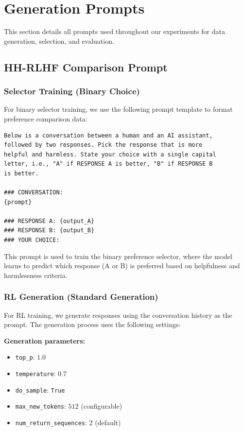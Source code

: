 \section{Generation Prompts}
\label{app:prompts}

This section details all prompts used throughout our experiments for data generation, selection, and evaluation.

\subsection{HH-RLHF Comparison Prompt}

\subsubsection{Selector Training (Binary Choice)}

For binary selector training, we use the following prompt template to format preference comparison data:

\begin{verbatim}
Below is a conversation between a human and an AI assistant, 
followed by two responses. Pick the response that is more 
helpful and harmless. State your choice with a single capital 
letter, i.e., "A" if RESPONSE A is better, "B" if RESPONSE B 
is better.

### CONVERSATION:
{prompt}

### RESPONSE A: {output_A}
### RESPONSE B: {output_B}
### YOUR CHOICE:
\end{verbatim}

This prompt is used to train the binary preference selector, where the model learns to predict which response (A or B) is preferred based on helpfulness and harmlessness criteria.

\subsubsection{RL Generation (Standard Generation)}

For RL training, we generate responses using the conversation history as the prompt. The generation process uses the following settings:

\textbf{Generation parameters:}
\begin{itemize}
    \item \texttt{top\_p}: $1.0$
    \item \texttt{temperature}: $0.7$
    \item \texttt{do\_sample}: \texttt{True}
    \item \texttt{max\_new\_tokens}: $512$ (configurable)
    \item \texttt{num\_return\_sequences}: $2$ (default)
\end{itemize}

